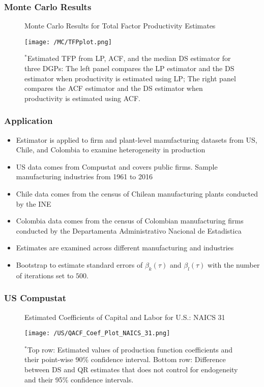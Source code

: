 \documentclass[xcolor={dvipsnames}, notheorems]{beamer}
\theoremstyle{plain}
\begin{document}

\begin{frame}
\frametitle{Monte Carlo Results}
\begin{figure}[H]
\centering
\caption{Monte Carlo Results for Total Factor Productivity Estimates}
\texttt{[image: /MC/TFPplot.png]}
\caption*{\footnotesize $^{*}$Estimated TFP from LP, ACF, and the median DS estimator for three DGPs: The left panel compares the LP estimator and the DS estimator when productivity is estimated using LP; The right panel compares the ACF estimator and the DS estimator when productivity is estimated using ACF.}
\label{fig:MCTFP}
\end{figure}
\end{frame}


\begin{frame}
\frametitle{Application}
\begin{itemize}
    \item Estimator is applied to firm and plant-level manufacturing datasets from US, Chile, and Colombia to examine heterogeneity in production
    \item US data comes from Compustat and covers public firms. Sample manufacturing industries from 1961 to 2016
    \item Chile data comes from the census of Chilean manufacturing plants conducted by the INE 
    \item Colombia data comes from the census of Colombian manufacturing firms conducted by the Departamenta Administrativo Nacional de Estadistica
    \item Estimates are examined across different manufacturing and industries
    \item Bootstrap to estimate standard errors of $\beta_{k}(\tau)$ and $\beta_{l}(\tau)$ with the number of iterations set to $500$.
\end{itemize}
\end{frame}


\begin{frame}
\frametitle{US Compustat}
\begin{figure}[H]
\centering
\caption{Estimated Coefficients of Capital and Labor for U.S.: NAICS 31}
\texttt{[image: /US/QACF\_Coef\_Plot\_NAICS\_31.png]}
\caption*{\footnotesize $^{*}$Top row: Estimated values of production function coefficients and their point-wise 90\% confidence interval. Bottom row: Difference between DS and QR estimates that does not control for endogeneity and their 95\% confidence intervals.}
\end{figure}
\end{frame}
\end{document}
